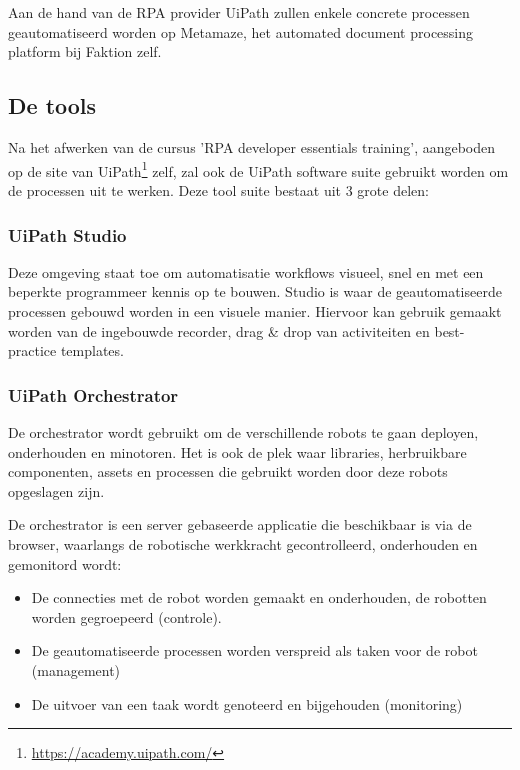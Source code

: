 \chapter{}
\label{ch:implementatie}

Aan de hand van de RPA provider UiPath zullen enkele concrete processen geautomatiseerd worden op Metamaze, het automated document processing platform bij Faktion zelf.

\section{De tools}
Na het afwerken van de cursus 'RPA developer essentials training', aangeboden op de site van UiPath\footnote{\url{https://academy.uipath.com/}} zelf, zal ook de UiPath software suite gebruikt worden om de processen uit te werken. Deze tool suite bestaat uit 3 grote delen:

\subsection{UiPath Studio}
Deze omgeving staat toe om automatisatie workflows visueel, snel en met een beperkte programmeer kennis op te bouwen. Studio is waar de geautomatiseerde processen gebouwd worden in een visuele manier. Hiervoor kan gebruik gemaakt worden van de ingebouwde recorder, drag \& drop van activiteiten en best-practice templates.

\subsection{UiPath Orchestrator}
De orchestrator wordt gebruikt om de verschillende robots te gaan deployen, onderhouden en minotoren. Het is ook de plek waar libraries, herbruikbare componenten, assets en processen die gebruikt worden door deze robots opgeslagen zijn.

De orchestrator is een server gebaseerde applicatie die beschikbaar is via de browser, waarlangs de robotische werkkracht gecontrolleerd, onderhouden en gemonitord wordt:
\begin{itemize}
	\item De connecties met de robot worden gemaakt en onderhouden, de robotten worden gegroepeerd (controle).
	\item De geautomatiseerde processen worden verspreid als taken voor de robot (management)
	\item De uitvoer van een taak wordt genoteerd en bijgehouden (monitoring)
\end{itemize}

